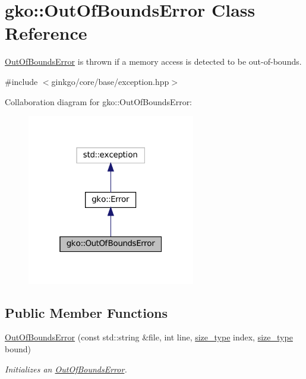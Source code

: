 \hypertarget{classgko_1_1OutOfBoundsError}{}\section{gko\+:\+:Out\+Of\+Bounds\+Error Class Reference}
\label{classgko_1_1OutOfBoundsError}


\hyperlink{classgko_1_1OutOfBoundsError}{Out\+Of\+Bounds\+Error} is thrown if a memory access is detected to be out-\/of-\/bounds.  




{\ttfamily \#include $<$ginkgo/core/base/exception.\+hpp$>$}



Collaboration diagram for gko\+:\+:Out\+Of\+Bounds\+Error\+:
\nopagebreak
\begin{figure}[H]
\begin{center}
\leavevmode
\includegraphics[width=208pt]{classgko_1_1OutOfBoundsError__coll__graph}
\end{center}
\end{figure}
\subsection*{Public Member Functions}
\begin{DoxyCompactItemize}
\item 
\hyperlink{classgko_1_1OutOfBoundsError_a21254b6802ba852e3f9f44744ad63faf}{Out\+Of\+Bounds\+Error} (const std\+::string \&file, int line, \hyperlink{namespacegko_a6e5c95df0ae4e47aab2f604a22d98ee7}{size\+\_\+type} index, \hyperlink{namespacegko_a6e5c95df0ae4e47aab2f604a22d98ee7}{size\+\_\+type} bound)
\begin{DoxyCompactList}\small\item\em Initializes an \hyperlink{classgko_1_1OutOfBoundsError}{Out\+Of\+Bounds\+Error}. \end{DoxyCompactList}\end{DoxyCompactItemize}


